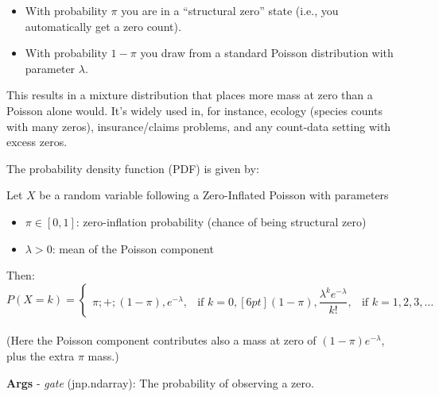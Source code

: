 \documentclass[
  letterpaper,
  DIV=11,
  numbers=noendperiod]{scrartcl}
\providecommand{\tightlist}{%
  \setlength{\itemsep}{0pt}\setlength{\parskip}{0pt}}\usepackage{longtable,booktabs,array}
\begin{document}
\begin{itemize}
\tightlist
\item
  With probability \(\pi\) you are in a ``structural zero'' state (i.e.,
  you automatically get a zero count).
\item
  With probability \(1 - \pi\) you draw from a standard Poisson
  distribution with parameter \(\lambda\).
\end{itemize}

This results in a mixture distribution that places more mass at zero
than a Poisson alone would. It's widely used in, for instance, ecology
(species counts with many zeros), insurance/claims problems, and any
count‐data setting with excess zeros.

The probability density function (PDF) is given by:

Let \(X\) be a random variable following a Zero-Inflated Poisson with
parameters

\begin{itemize}
\tightlist
\item
  \(\pi\in[0,1]\): zero-inflation probability (chance of being
  structural zero)
\item
  \(\lambda>0\): mean of the Poisson component
\end{itemize}

Then: \[
P(X = k) =
\begin{cases}
\pi ;+; (1 - \pi),e^{-\lambda}, & \text{if } k = 0, [6pt]
(1 - \pi),\dfrac{\lambda^k e^{-\lambda}}{k!}, & \text{if } k = 1,2,3,\dots
\end{cases}
\]\\
(Here the Poisson component contributes also a mass at zero of
\((1 - \pi)e^{-\lambda}\), plus the extra \(\pi\) mass.)

\textbf{Args} - \emph{gate} (jnp.ndarray): The probability of observing
a zero.
\end{document}
